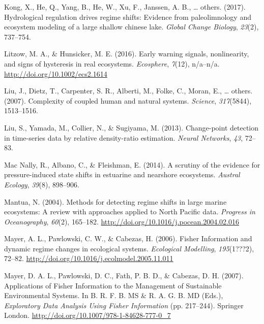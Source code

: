 \documentclass[12pt,twoside,openany]{reedthesis}
\begin{document}
\leavevmode\hypertarget{ref-kong2017hydrological}{}%
Kong, X., He, Q., Yang, B., He, W., Xu, F., Janssen, A. B., \ldots{} others. (2017). Hydrological regulation drives regime shifts: Evidence from paleolimnology and ecosystem modeling of a large shallow chinese lake. \emph{Global Change Biology}, \emph{23}(2), 737--754.

\leavevmode\hypertarget{ref-litzow_early_2016}{}%
Litzow, M. A., \& Hunsicker, M. E. (2016). Early warning signals, nonlinearity, and signs of hysteresis in real ecosystems. \emph{Ecosphere}, \emph{7}(12), n/a--n/a. \url{http://doi.org/10.1002/ecs2.1614}

\leavevmode\hypertarget{ref-liu_complexity_2007}{}%
Liu, J., Dietz, T., Carpenter, S. R., Alberti, M., Folke, C., Moran, E., \ldots{} others. (2007). Complexity of coupled human and natural systems. \emph{Science}, \emph{317}(5844), 1513--1516.

\leavevmode\hypertarget{ref-liu2013change}{}%
Liu, S., Yamada, M., Collier, N., \& Sugiyama, M. (2013). Change-point detection in time-series data by relative density-ratio estimation. \emph{Neural Networks}, \emph{43}, 72--83.

\leavevmode\hypertarget{ref-mac2014scrutiny}{}%
Mac Nally, R., Albano, C., \& Fleishman, E. (2014). A scrutiny of the evidence for pressure-induced state shifts in estuarine and nearshore ecosystems. \emph{Austral Ecology}, \emph{39}(8), 898--906.

\leavevmode\hypertarget{ref-mantua_methods_2004}{}%
Mantua, N. (2004). Methods for detecting regime shifts in large marine ecosystems: A review with approaches applied to North Pacific data. \emph{Progress in Oceanography}, \emph{60}(2), 165--182. \url{http://doi.org/10.1016/j.pocean.2004.02.016}

\leavevmode\hypertarget{ref-mayer_fisher_2006}{}%
Mayer, A. L., Pawlowski, C. W., \& Cabezas, H. (2006). Fisher Information and dynamic regime changes in ecological systems. \emph{Ecological Modelling}, \emph{195}(1???2), 72--82. \url{http://doi.org/10.1016/j.ecolmodel.2005.11.011}

\leavevmode\hypertarget{ref-mayer_applications_2007}{}%
Mayer, D. A. L., Pawlowski, D. C., Fath, P. B. D., \& Cabezas, D. H. (2007). Applications of Fisher Information to the Management of Sustainable Environmental Systems. In B. R. F. B. MS \& R. A. G. B. MD (Eds.), \emph{Exploratory Data Analysis Using Fisher Information} (pp. 217--244). Springer London. \url{http://doi.org/10.1007/978-1-84628-777-0_7}
\end{document}
